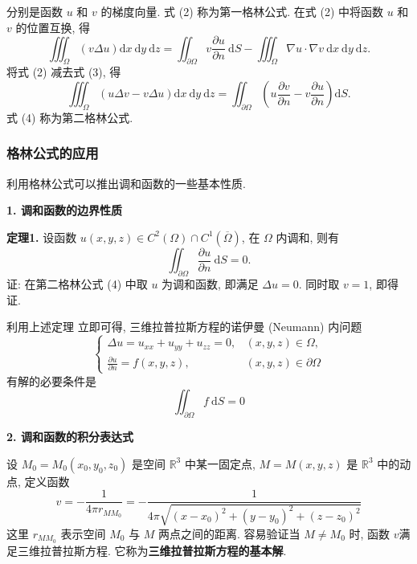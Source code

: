 分别是函数 $ u $ 和 $ v $ 的梯度向量. 式 (2) 称为第一格林公式.
在式 (2) 中将函数 $ u $ 和 $ v $ 的位置互换, 得
\begin{equation*}
    \iiint_{\Omega}(v \Delta u) \mathrm{d} x \mathrm{~d} y \mathrm{~d} z=\iint_{\partial \Omega} v \frac{\partial u}{\partial n} \mathrm{~d} S-\iiint_{\Omega} \nabla u \cdot \nabla v \mathrm{~d} x \mathrm{~d} y \mathrm{~d} z .\tag{3}
\end{equation*}
将式 (2) 减去式 (3), 得
\begin{equation*}
    \iiint_{\Omega}(u \Delta v-v \Delta u) \mathrm{d} x \mathrm{~d} y \mathrm{~d} z=\iint_{\partial \Omega}\left(u \frac{\partial v}{\partial n}-v \frac{\partial u}{\partial n}\right) \mathrm{d} S .\tag{4}
\end{equation*}
式 (4) 称为第二格林公式.

\subsubsection{格林公式的应用}

利用格林公式可以推出调和函数的一些基本性质.

\textbf{1. 调和函数的边界性质}

\textbf{定理1.} 设函数 $ u(x, y, z) \in C^{2}(\Omega) \cap C^{1}(\overline{\Omega}) $, 在 $ \Omega $ 内调和, 则有
$$
\iint_{\partial \Omega} \frac{\partial u}{\partial n} \mathrm{~d} S=0 .
$$
证: 在第二格林公式 (4) 中取 $ u $ 为调和函数, 即满足 $ \Delta u=0 $. 同时取 $ v=1 $, 即得证.

利用上述定理 立即可得, 三维拉普拉斯方程的诺伊曼 (Neumann) 内问题
$$
\left\{\begin{array}{ll}
\Delta u=u_{x x}+u_{y y}+u_{z z}=0, & (x, y, z) \in \Omega, \\
\frac{\partial u}{\partial n}=f(x, y, z), & (x, y, z) \in \partial \Omega
\end{array}\right.
$$
有解的必要条件是
$$
\iint_{\partial \Omega} f \mathrm{~d} S=0
$$

\textbf{2. 调和函数的积分表达式}

设 $ M_{0}=M_{0}\left(x_{0}, y_{0}, z_{0}\right) $ 是空间 $ \mathbb{R}^{3} $ 中某一固定点, $ M=M(x, y, z) $ 是 $ \mathbb{R}^{3} $ 中的动点, 定义函数
$$
v=-\frac{1}{4 \pi r_{M M_{0}}}=-\frac{1}{4 \pi \sqrt{\left(x-x_{0}\right)^{2}+\left(y-y_{0}\right)^{2}+\left(z-z_{0}\right)^{2}}}
$$
这里 $ r_{M M_{0}} $ 表示空间 $ M_{0} $ 与 $ M $ 两点之间的距离. 容易验证当 $ M \neq M_{0} $ 时, 函数 $ v $满足三维拉普拉斯方程. 它称为\textbf{三维拉普拉斯方程的基本解}.

